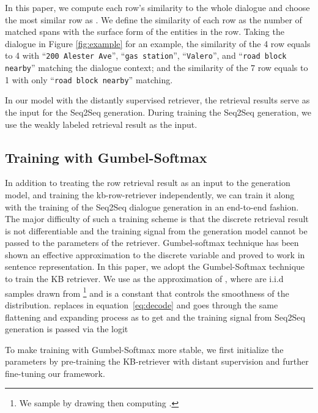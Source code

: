 \documentclass[11pt,a4paper]{article}
\begin{document}
 In this paper, we compute each row's similarity to the whole dialogue
 and choose the most similar row as .
 We define the similarity of each row
 as the number of matched spans
 with the surface
 form of the entities in the row.
 Taking the dialogue in Figure \ref{fig:example} for an example,
 the similarity of the 4 row equals to 4 with ``\texttt{200 Alester Ave}'',
 ``\texttt{gas station}'', ``\texttt{Valero}'', and ``\texttt{road block nearby}''
 matching the dialogue context;
 and the similarity of the 7 row equals to 1 with only ``\texttt{road block nearby}''
 matching.
 
 In our model with the distantly supervised retriever,
 the retrieval results serve as the input
 for the Seq2Seq generation.
 During training the Seq2Seq generation,
 we use the weakly labeled retrieval result 
 as the input.

 
 \subsection{Training  with Gumbel-Softmax}
 In addition to treating the row retrieval result as an input to the generation model,
 and training the kb-row-retriever independently,
 we can train it along with the
 training of the Seq2Seq dialogue generation in an end-to-end fashion.
 The major difficulty of such a training scheme
 is that the discrete retrieval result is not differentiable
 and the training signal from the generation model cannot be passed
 to the parameters of the retriever.
 Gumbel-softmax technique \cite{45822} has been shown an
 effective approximation to the discrete variable
 and proved to work in sentence representation.
 In this paper, we adopt the Gumbel-Softmax technique to train the KB retriever.
 We use 
 as the approximation of ,
 where
  are i.i.d samples drawn from \footnote{
 	We sample  by drawing  then computing .
 }
 and  is a constant that controls the smoothness of the distribution.
  replaces  in equation~\ref{eq:decode} and goes through the same
 flattening and expanding process as 
 to get  and
 the training signal from Seq2Seq generation
 is passed via the logit
 	
 To make training with Gumbel-Softmax more stable,
 we first initialize the parameters by pre-training the KB-retriever with distant supervision and further fine-tuning our framework.
 
\end{document}
